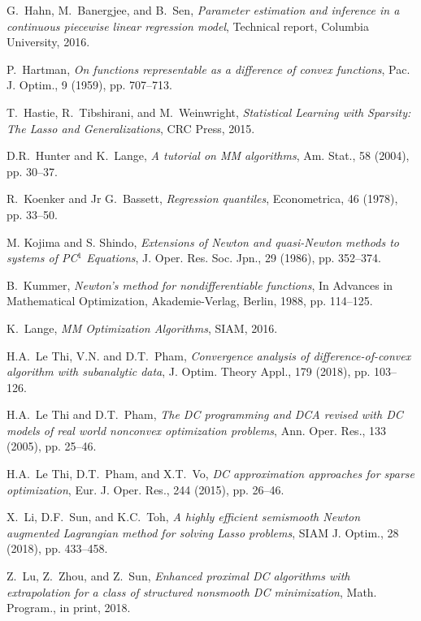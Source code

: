 \documentclass{siamart}
\begin{document}
\begin{thebibliography}{999}
{
{\sc G.\ Hahn, M.\ Banergjee, and B.\ Sen},
{\sl Parameter estimation and inference in a continuous piecewise linear regression model},
Technical report, Columbia University, 2016.

{\sc P.\ Hartman},
{\sl On functions representable as a difference of convex functions},
Pac. J. Optim., 9 (1959), pp. 707--713.

{\sc T.\ Hastie, R.\ Tibshirani, and M.\ Weinwright},
{\sl Statistical Learning with Sparsity: The Lasso and Generalizations},
CRC Press, 2015.

{\sc D.R.\ Hunter and  K.\ Lange},
{\sl A tutorial on MM algorithms},
Am. Stat., 58 (2004), pp. 30--37.


{\sc R.\ Koenker and Jr G.\ Bassett},
{\sl Regression quantiles},
Econometrica, 46 (1978),  pp. 33--50.


{\sc M. Kojima and S. Shindo},
{\sl Extensions of Newton and quasi-Newton methods to systems of PC$^1$ Equations},
J. Oper. Res. Soc. Jpn., 29 (1986), pp. 352--374.

{\sc B.\ Kummer},
{\sl Newton's method for nondifferentiable functions},
In Advances in Mathematical Optimization,  Akademie-Verlag, Berlin, 1988, pp. 114--125.

{\sc K.\ Lange},
{\sl MM Optimization Algorithms}, SIAM, 2016.

{\sc H.A.\ Le Thi, V.N. and D.T.\ Pham},
{\sl Convergence analysis of difference-of-convex algorithm with subanalytic data},
J. Optim. Theory Appl., 179 (2018), pp. 103--126.

{\sc H.A.\ Le Thi and D.T.\ Pham},
{\sl The DC programming and DCA revised with DC models of real world nonconvex optimization problems},
Ann. Oper. Res., 133 (2005), pp. 25--46.

{\sc H.A.\ Le Thi, D.T.\ Pham, and X.T.\ Vo},
{\sl DC approximation approaches for sparse optimization},
Eur. J. Oper. Res., 244 (2015), pp. 26--46.


{\sc X.\ Li, D.F.\ Sun, and K.C.\ Toh},
{\sl A highly efficient semismooth Newton augmented Lagrangian method for solving Lasso problems}, 
SIAM J. Optim.,  28 (2018), pp. 433--458.

{\sc Z.\ Lu, Z.\ Zhou, and Z.\ Sun},
{\sl Enhanced proximal DC algorithms with extrapolation for a class of structured nonsmooth DC minimization},
Math. Program., in print, 2018.

}
\end{thebibliography}
\end{document}
